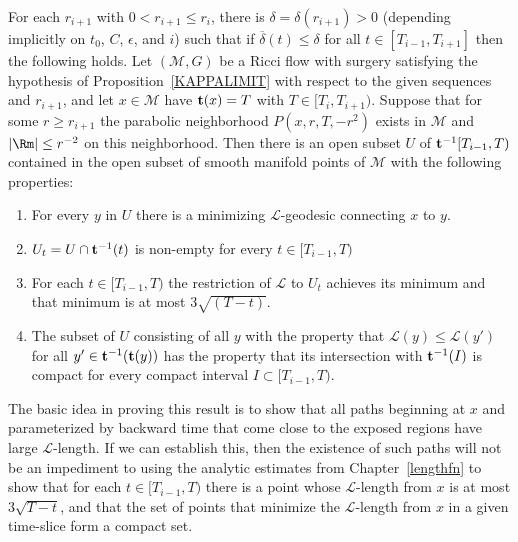 \begin{proposition}
\label{prop:minimizing-L-geodesics-exist}
\label{delta0ri+1}
For each $r_{i+1}$ with $0<r_{i+1}\le r_i$, there is
$\delta=\delta(r_{i+1})>0$ (depending implicitly on $t_0$, $C$,
$\epsilon$, and $i$) such that if $\overline\delta(t)\le \delta$ for
all $t\in [T_{i-1},T_{i+1}]$ then the following holds. Let
$({\mathcal M},G)$ be a Ricci flow with surgery satisfying the
hypothesis of Proposition~\ref{KAPPALIMIT} with respect to the given
sequences and $r_{i+1}$, and let $x\in {\mathcal M}$ have ${\bf
t}(x)=T$ with $T\in [T_i,T_{i+1})$. Suppose that for some $r\ge
r_{i+1}$ the parabolic neighborhood $P(x,r,T,-r^2)$ exists in
${\mathcal M}$ and $|\Rm|\le r^{-2}$ on this neighborhood. Then
there is an open subset $U$ of ${\bf t}^{-1}[T_{i-1},T)$ contained
in the open subset of smooth manifold points  of ${\mathcal M}$ with
the following properties:
\begin{enumerate}
\item[(1)] For every $y$ in $U$ there is a minimizing ${\mathcal L}$-geodesic
connecting $x$ to $y$.
\item[(2)] $U_t=U\cap {\bf t}^{-1}(t)$ is non-empty for every $t\in [T_{i-1},T)$
\item[(3)] For each $t\in [T_{i-1},T)$ the restriction of ${\mathcal
L}$ to $U_t$ achieves its minimum and that minimum is at most
$3\sqrt{(T-t)}$.
\item[(4)] The subset of $U$ consisting of all $y$ with the property that
${\mathcal L}(y)\le {\mathcal L}(y')$ for all $y'\in {\bf
t}^{-1}({\bf t}(y))$ has the property that its intersection with
${\bf t}^{-1}(I)$ is compact for every compact interval $I\subset
[T_{i-1},T)$.
\end{enumerate}
\end{proposition}


The basic idea in proving this result is to show that all paths
beginning at $x$ and parameterized by backward time that come close
to the exposed regions have large ${\mathcal L}$-length. If we can
establish this, then the existence of such paths will not be an
impediment to using the analytic estimates from
Chapter~\ref{lengthfn} to show that for each $t\in [T_{i-1},T)$
there is a point whose ${\mathcal L}$-length from $x$ is at most
$3\sqrt{T-t}$, and that the set of points that minimize the
${\mathcal L}$-length from $x$ in a given time-slice form a compact
set.

